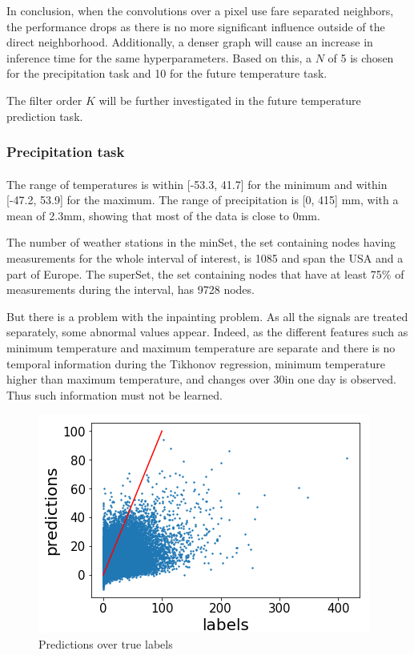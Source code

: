 \documentclass[11pt]{report}
\begin{document}
In conclusion, when the convolutions over a pixel use fare separated neighbors, the performance drops as there is no more significant influence outside of the direct neighborhood. Additionally, a denser graph will cause an increase in inference time for the same hyperparameters. Based on this, a $N$ of 5 is chosen for the precipitation task and 10 for the future temperature task.

The filter order $K$ will be further investigated in the future temperature prediction task.

\subsubsection{Precipitation task}
\paragraph*{}
The range of temperatures is within [-53.3, 41.7] for the minimum and within [-47.2, 53.9] for the maximum. The range of precipitation is [0, 415] mm, with a mean of 2.3mm, showing that most of the data is close to 0mm.

The number of weather stations in the minSet, the set containing nodes having measurements for the whole interval of interest, is 1085 and span the USA and a part of Europe. The superSet, the set containing nodes that have at least 75\% of measurements during the interval, has 9728 nodes.

But there is a problem with the inpainting problem. As all the signals are treated separately, some abnormal values appear. Indeed, as the different features such as minimum temperature and maximum temperature are separate and there is no temporal information during the Tikhonov regression, minimum temperature higher than maximum temperature, and changes over 30\degree in one day is observed. Thus such information must not be learned.

\begin{figure}[!ht]
    \centering
    \includegraphics[width=0.5\linewidth]{figures/prec_reg_results.png}
    \caption{Predictions over true labels}
    \label{fig:prec_reg_res}
\end{figure}
\end{document}

